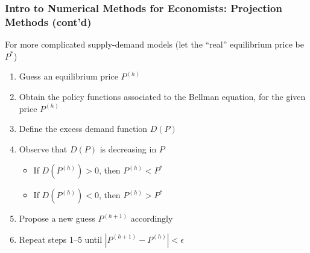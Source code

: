\documentclass[10pt, aspectratio=1610, handout]{beamer}
\begin{document}
  \begin{frame}
    \frametitle{Intro to Numerical Methods for Economists: Projection Methods (cont'd)}

    For more complicated supply-demand models (let the ``real'' equilibrium price be $P^*$)
    \begin{enumerate}
      \item Guess an equilibrium price $P^{(h)}$
      \item Obtain the policy functions associated to the Bellman equation, for the given price $P^{(h)}$
      \item Define the excess demand function $D(P)$
      \item Observe that $D(P)$ is decreasing in $P$
        \begin{itemize}
          \item If $D(P^{(h)}) > 0$, then $P^{(h)} < P^*$
          \item If $D(P^{(h)}) < 0$, then $P^{(h)} > P^*$
        \end{itemize}
      \item Propose a new guess $P^{(h+1)}$ accordingly
      \item Repeat steps 1--5 until $| P^{(h+1)} - P^{(h)} | < \epsilon$
    \end{enumerate}

  \end{frame}
\end{document}
